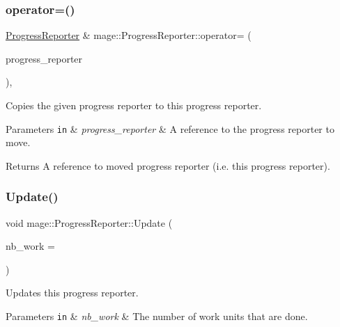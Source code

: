 \subsubsection{\texorpdfstring{operator=()}{operator=()}\hspace{0.1cm}{\footnotesize\ttfamily [2/2]}}
{\footnotesize\ttfamily \hyperlink{classmage_1_1_progress_reporter}{Progress\+Reporter} \& mage\+::\+Progress\+Reporter\+::operator= (\begin{DoxyParamCaption}\item[{\hyperlink{classmage_1_1_progress_reporter}{Progress\+Reporter} \&\&}]{progress\+\_\+reporter }\end{DoxyParamCaption})\hspace{0.3cm}{\ttfamily [default]}, {\ttfamily [noexcept]}}

Copies the given progress reporter to this progress reporter.


\begin{DoxyParams}[1]{Parameters}
\mbox{\tt in}  & {\em progress\+\_\+reporter} & A reference to the progress reporter to move. \\
\hline
\end{DoxyParams}
\begin{DoxyReturn}{Returns}
A reference to moved progress reporter (i.\+e. this progress reporter). 
\end{DoxyReturn}
\hypertarget{classmage_1_1_progress_reporter_a62009a4466cdd2766afee0da34338338}{}\label{classmage_1_1_progress_reporter_a62009a4466cdd2766afee0da34338338} 
\subsubsection{\texorpdfstring{Update()}{Update()}}
{\footnotesize\ttfamily void mage\+::\+Progress\+Reporter\+::\+Update (\begin{DoxyParamCaption}\item[{\hyperlink{namespacemage_a41c104c036fba3756a74e19f793eeaa1}{U32}}]{nb\+\_\+work = {} }\end{DoxyParamCaption})}

Updates this progress reporter.


\begin{DoxyParams}[1]{Parameters}
\mbox{\tt in}  & {\em nb\+\_\+work} & The number of work units that are done. \\
\hline
\end{DoxyParams}


